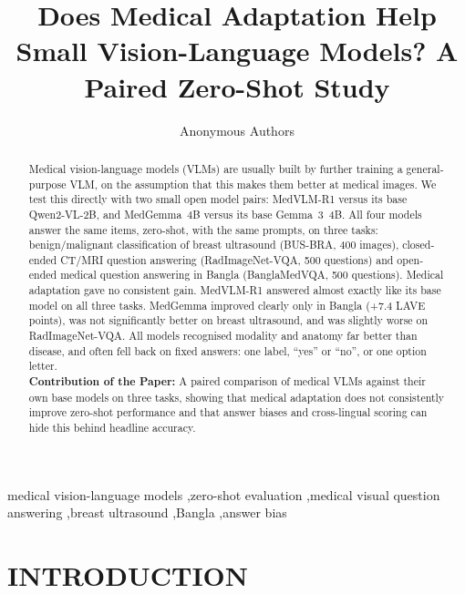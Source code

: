\documentclass[doublecolumn]{ijcvsplatex}
\newcommand{\qwen}{Qwen2-VL}
\newcommand{\medvlm}{MedVLM-R1}
\newcommand{\gemma}{Gemma~3}
\newcommand{\medgemma}{MedGemma}
\begin{document}
\begin{frontmatter}

\title{Does Medical Adaptation Help Small Vision-Language Models? A Paired Zero-Shot Study}

\author{Anonymous Authors}
\address{Affiliation withheld for double-blind review}

\begin{abstract}
Medical vision-language models (VLMs) are usually built by further training a general-purpose VLM, on the assumption that this makes them better at medical images. We test this directly with two small open model pairs: \medvlm{} versus its base \qwen{}-2B, and \medgemma{}~4B versus its base \gemma{}~4B. All four models answer the same items, zero-shot, with the same prompts, on three tasks: benign/malignant classification of breast ultrasound (BUS-BRA, 400 images), closed-ended CT/MRI question answering (RadImageNet-VQA, 500 questions) and open-ended medical question answering in Bangla (BanglaMedVQA, 500 questions). Medical adaptation gave no consistent gain. \medvlm{} answered almost exactly like its base model on all three tasks. \medgemma{} improved clearly only in Bangla (+7.4 LAVE points), was not significantly better on breast ultrasound, and was slightly worse on RadImageNet-VQA. All models recognised modality and anatomy far better than disease, and often fell back on fixed answers: one label, “yes” or “no”, or one option letter.
\\
\textbf{Contribution of the Paper:} A paired comparison of medical VLMs against their own base models on three tasks, showing that medical adaptation does not consistently improve zero-shot performance and that answer biases and cross-lingual scoring can hide this behind headline accuracy.
\end{abstract}

\begin{keyword}
medical vision-language models \sep zero-shot evaluation \sep medical visual question answering \sep breast ultrasound \sep Bangla \sep answer bias
\end{keyword}

\end{frontmatter}

\section{INTRODUCTION}
\label{sec_intro}
\end{document}
